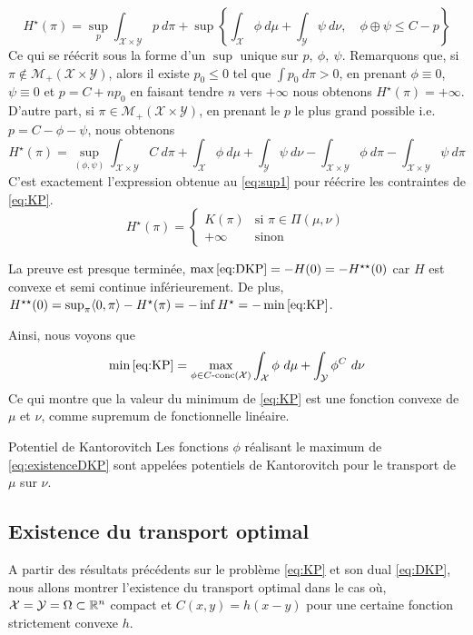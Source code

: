 \documentclass[a4paper,12pt]{article}
\begin{document}
\begin{preuve}
$$
H^{\star}(\pi)= \sup_p \int_{\mathcal{X}\times\mathcal{Y}} p\ d\pi + \sup \left\{ \int_{\mathcal{X}}\phi\ d\mu + \int_{\mathcal{Y}}\psi\ d\nu, \quad \phi\oplus\psi\leq C- p \right\}
$$
Ce qui se réécrit sous la forme d'un $\sup$ unique sur $p,\ \phi,\ \psi$. Remarquons que, si $\pi\notin\mathcal{M}_+(\mathcal{X}\times\mathcal{Y})$, alors il existe $p_0\leq 0$ tel que $\int p_0\ d\pi >0$, en prenant $\phi\equiv 0$, $\psi\equiv 0$ et $p=C+np_0$ en faisant tendre $n$ vers $+\infty$ nous obtenons $H^{\star}(\pi)=+\infty$.\\
D'autre part, si $\pi\in\mathcal{M}_+(\mathcal{X}\times\mathcal{Y})$, en prenant le $p$ le plus grand possible i.e. $p=C-\phi-\psi$, nous obtenons 
$$
H^{\star}(\pi)=  \sup_{(\phi,\psi)} \int_{\mathcal{X}\times\mathcal{Y}} C\ d\pi + \int_{\mathcal{X}}\phi\ d\mu + \int_{\mathcal{Y}}\psi\ d\nu - \int_{\mathcal{X}\times\mathcal{Y}} \phi\ d\pi -\int_{\mathcal{X}\times\mathcal{Y}} \psi\ d\pi
$$
C'est exactement l'expression obtenue au \eqref{eq:sup1} pour réécrire les contraintes de \eqref{eq:KP}. 
$$
H^{\star}(\pi)=\left\{
\begin{array}{cl}
K(\pi) & \text{si } \pi \in\Pi(\mu,\nu)\\
+\infty & \text{sinon}
\end{array}
\right.
$$

La preuve est presque terminée, $\max\eqref{eq:DKP} = -H(0) =- H^{\star\star}(0)$ car $H$ est convexe et semi continue inférieurement. De plus, $H^{\star\star}(0)=\sup_{\pi}\langle 0,\pi\rangle-H^{\star}(\pi)=-\inf H^{\star}=-\min\eqref{eq:KP}$.
\end{preuve}

Ainsi, nous voyons que 
$$
\min\eqref{eq:KP}= \max_{\phi\in C\text{-conc}(\mathcal{X})}\int_{\mathcal{X}}\phi\ d\mu +\int_{\mathcal{Y}} \phi^C\ d\nu
$$
Ce qui montre que la valeur du minimum de \eqref{eq:KP} est une fonction convexe de $\mu$ et $\nu$, comme supremum de fonctionnelle linéaire. 
\begin{definition}{Potentiel de Kantorovitch}
Les fonctions $\phi$ réalisant le maximum de \eqref{eq:existenceDKP} sont appelées potentiels de Kantorovitch pour le transport de $\mu$ sur $\nu$.
\end{definition}

\subsection{Existence du transport optimal}

A partir des résultats précédents sur le problème \eqref{eq:KP} et son dual \eqref{eq:DKP}, nous allons montrer l'existence du transport optimal dans le cas où, $\mathcal{X}=\mathcal{Y}=\Omega\subset\mathbb{R}^n$ compact et $C(x,y)=h(x-y)$ pour une certaine fonction strictement convexe $h$. 
\end{document}
